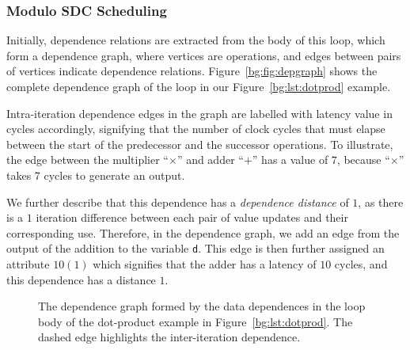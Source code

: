 \subsubsection{Modulo SDC Scheduling}

Initially, dependence relations are extracted from the body of this loop, which
form a dependence graph, where vertices are operations, and edges between pairs
of vertices indicate dependence relations.  Figure~\ref{bg:fig:depgraph} shows
the complete dependence graph of the loop in our Figure~\ref{bg:lst:dotprod}
example.

Intra-iteration dependence edges in the graph are labelled with latency value
in cycles accordingly, signifying that the number of clock cycles that must
elapse between the start of the predecessor and the successor operations.  To
illustrate, the edge between the multiplier ``$\times$'' and adder ``$+$'' has
a value of $7$, because ``$\times$'' takes 7 cycles to generate an output.

We further describe that this dependence has a \emph{dependence distance}
of $1$, as there is a $1$ iteration difference between each pair of value
updates and their corresponding use.  Therefore, in the dependence graph, we
add an edge from the output of the addition to the variable \verb|d|.  This
edge is then further assigned an attribute $10 (1)$ which signifies that
the adder has a latency of $10$ cycles, and this dependence has a distance
$1$.

\begin{figure}[ht]
    \centering
    \caption{%
        The dependence graph formed by the data dependences in the loop body
        of the dot-product example in Figure~\ref{bg:lst:dotprod}.  The dashed
        edge highlights the inter-iteration dependence.
    }\label{bg:fig:dotprod_depgraph}
\end{figure}

